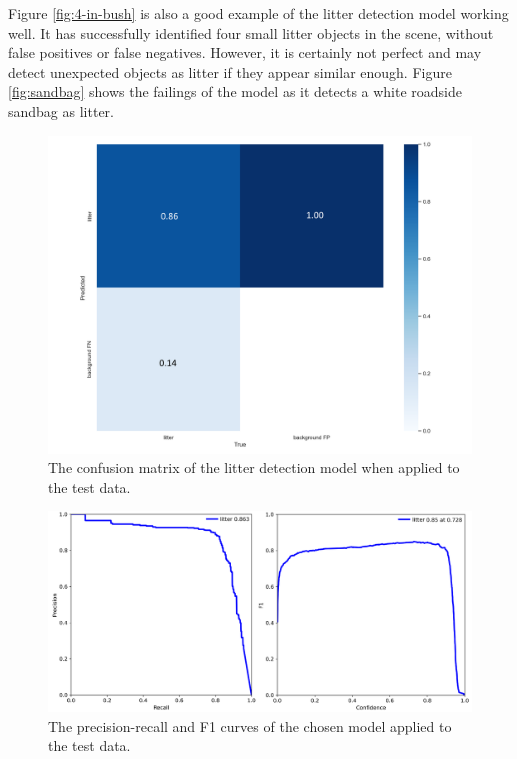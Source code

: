 \documentclass{thesis}
\begin{document}
Figure \ref{fig:4-in-bush} is also a good example of the litter detection model working well. It has successfully identified four small litter objects in the scene, without false positives or false negatives. However, it is certainly not perfect and may detect unexpected objects as litter if they appear similar enough. Figure \ref{fig:sandbag} shows the failings of the model as it detects a white roadside sandbag as litter.

\newpage
\begin{figure}[h!]
    \centering
    \includegraphics[scale=0.45]{images/fm-confusion-matrix.png}
    \caption{The confusion matrix of the litter detection model when applied to the test data.}
    \label{fig:fm-confusion-matrix}
\end{figure}

\begin{figure}[h!]
    \centering
    \includegraphics[scale=0.3]{images/fm-prf1-curves.png}
    \caption{The precision-recall and F1 curves of the chosen model applied to the test data.}
    \label{fig:fm-prf1-curve}
\end{figure}
\newpage
\end{document}
